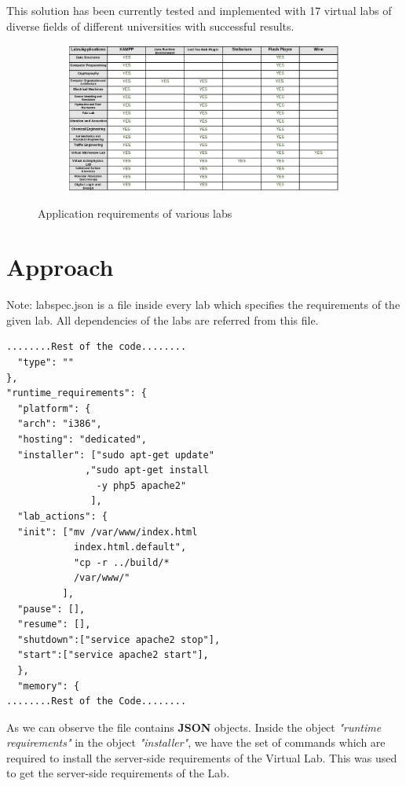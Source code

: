\documentclass[conference]{IEEEtran}
\begin{document}
  This solution has been currently tested and implemented with 17 virtual labs of diverse fields of different  universities with successful results.\\
    \begin{figure}
    \begin{subfigure}{2\columnwidth}
      \includegraphics[width=1.04\textwidth,height=0.7\textwidth]{table.png}
    \end{subfigure}
    \caption{Application requirements of various labs}
    \label{fig:appreq}
\end{figure}
\section{Approach}
   Note: labspec.json is a file inside every lab which specifies the requirements of the given lab. All dependencies of the labs are referred from this file.
  \begin{lstlisting}[frame=single]
........Rest of the code........  
  "type": ""
}, 
"runtime_requirements": {
  "platform": {
  "arch": "i386", 
  "hosting": "dedicated", 
  "installer": ["sudo apt-get update"
              ,"sudo apt-get install 
                -y php5 apache2"
               ], 
  "lab_actions": {
  "init": ["mv /var/www/index.html 
            index.html.default",
            "cp -r ../build/* 
            /var/www/"
          ], 
  "pause": [], 
  "resume": [], 
  "shutdown":["service apache2 stop"], 
  "start":["service apache2 start"],  
  }, 
  "memory": {
........Rest of the Code........
  \end{lstlisting}
  As we can observe the file contains \textbf{JSON} objects. Inside the object \textit{"runtime requirements"} in the object \textit{"installer"}, we have the set of commands which are required to install the server-side requirements of the Virtual Lab. This was used to get the server-side requirements of the Lab.
\end{document}
